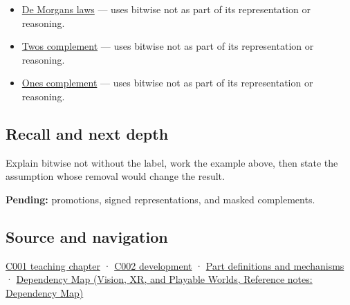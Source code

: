 \hypertarget{appendix-8f38927cfc54-used-by}{}

\begin{itemize}
\tightlist
\item
  \hyperref[appendix-9079d3659da4]{De Morgan\textquotesingle s laws} --- uses bitwise not as part of its representation or reasoning.
\item
  \hyperref[appendix-4fbc03d20829]{Two\textquotesingle s complement} --- uses bitwise not as part of its representation or reasoning.
\item
  \hyperref[appendix-03c678cd40b3]{One\textquotesingle s complement} --- uses bitwise not as part of its representation or reasoning.
\end{itemize}

\subsection{Recall and next depth}\label{appendix-8f38927cfc54-recall-and-next-depth}

\hypertarget{appendix-8f38927cfc54-recall-and-next-depth}{}

Explain bitwise not without the label, work the example above, then state the assumption whose removal would change the result.

\textbf{Pending:} promotions, signed representations, and masked complements.

\subsection{Source and navigation}\label{appendix-8f38927cfc54-source-and-navigation}

\hypertarget{appendix-8f38927cfc54-source-and-navigation}{}

\hyperref[01-foundations-i-ch001-from-a-signal-to-an-interpretation]{C001 teaching chapter} · \hyperref[01-foundations-i-ch001-arithmetic-becomes-a-policy]{C002 development} · \hyperref[appendix-fd090d982a15]{Part definitions and mechanisms} · \href{../07-Vision-XR-and-Playable-Worlds/main.pdf\#nameddest=appendix-4ad47bdd269a}{Dependency Map (Vision, XR, and Playable Worlds, Reference notes: Dependency Map)}

